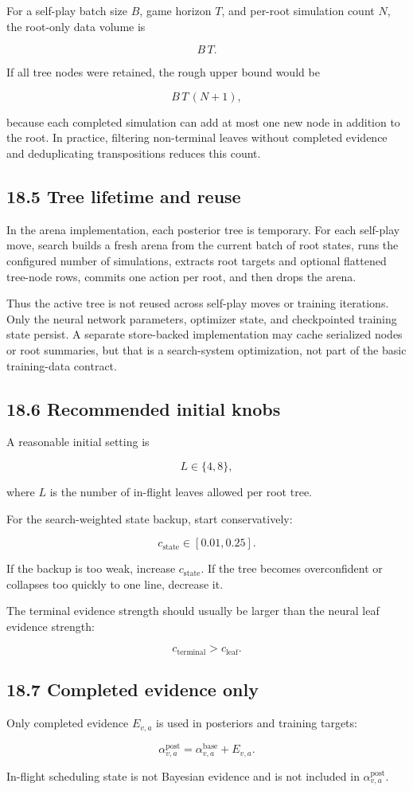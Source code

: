 \documentclass[11pt]{article}
\begin{document}
For a self-play batch size \(B\), game horizon \(T\), and per-root simulation
count \(N\), the root-only data volume is

\[
B\,T.
\]

If all tree nodes were retained, the rough upper bound would be

\[
B\,T\,(N+1),
\]

because each completed simulation can add at most one new node in addition to the
root. In practice, filtering non-terminal leaves without completed evidence and
deduplicating transpositions reduces this count.

\subsection*{18.5 Tree lifetime and reuse}

In the arena implementation, each posterior tree is temporary. For each self-play
move, search builds a fresh arena from the current batch of root states, runs the
configured number of simulations, extracts root targets and optional flattened
tree-node rows, commits one action per root, and then drops the arena.

Thus the active tree is not reused across self-play moves or training
iterations. Only the neural network parameters, optimizer state, and checkpointed
training state persist. A separate store-backed implementation may cache
serialized nodes or root summaries, but that is a search-system optimization, not
part of the basic training-data contract.

\subsection*{18.6 Recommended initial knobs}

A reasonable initial setting is

\[
L \in \{4,8\},
\]

where \(L\) is the number of in-flight leaves allowed per root tree.

For the search-weighted state backup, start conservatively:

\[
c_{\mathrm{state}} \in [0.01,0.25].
\]

If the backup is too weak, increase \(c_{\mathrm{state}}\). If the tree becomes
overconfident or collapses too quickly to one line, decrease it.

The terminal evidence strength should usually be larger than the neural leaf
evidence strength:

\[
c_{\mathrm{terminal}} > c_{\mathrm{leaf}}.
\]

\subsection*{18.7 Completed evidence only}

Only completed evidence \(E_{v,a}\) is used in posteriors and training targets:

\[
\alpha^{\mathrm{post}}_{v,a}
=
\alpha^{\mathrm{base}}_{v,a}
+
E_{v,a}.
\]

In-flight scheduling state is not Bayesian evidence and is not included in
\(\alpha^{\mathrm{post}}_{v,a}\).
\end{document}
